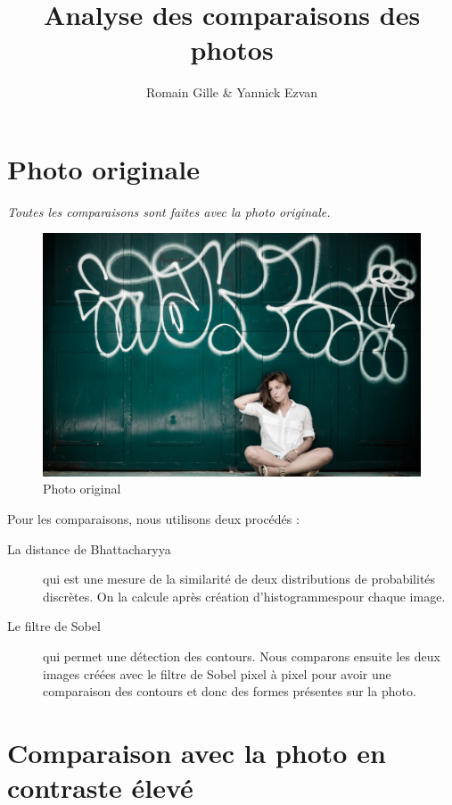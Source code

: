 \documentclass[]{article}
\title{Analyse des comparaisons des photos}
\author{Romain Gille \& Yannick Ezvan}
\date{}
\begin{document}
\maketitle

{
\hypersetup{linkcolor=black}
\setcounter{tocdepth}{3}
\tableofcontents
}

\newpage

\section{Photo originale}\label{photo-originale}

\emph{Toutes les comparaisons sont faites avec la photo originale.}

\begin{figure}[htbp]
\centering
\includegraphics{photos/original.jpg}
\caption{Photo original}
\end{figure}

Pour les comparaisons, nous utilisons deux procédés :

\begin{description}  
\item[La distance de Bhattacharyya] qui est une mesure de la similarité de deux 
  distributions de probabilités discrètes. On la calcule après création 
  d'histogrammespour chaque image.
\item[Le filtre de Sobel] qui permet une détection des contours. Nous comparons
  ensuite les deux images créées avec le filtre de Sobel pixel à pixel pour
  avoir une comparaison des contours et donc des formes présentes sur la photo.
\end{description}

\newpage

\section{Comparaison avec la photo en contraste
élevé}\label{comparaison-avec-la-photo-en-contraste-uxe9levuxe9}
\end{document}
